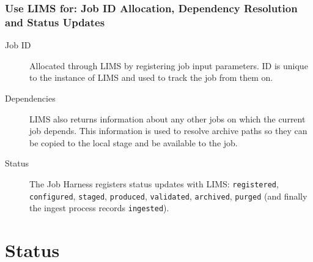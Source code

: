 \documentclass[xcolor=dvipsnames]{beamer}
\newcommand{\code}[1]{\texttt{#1}}
\begin{document}
\begin{frame}
  \frametitle{Use LIMS for: Job ID Allocation, Dependency Resolution and Status Updates}

  \begin{description}
  \item[Job ID] Allocated through LIMS by registering job input
    parameters.  ID is unique to the instance of LIMS and used to
    track the job from them on.
  \item[Dependencies] LIMS also returns information about any other
    jobs on which the current job depends.  This information is used
    to resolve archive paths so they can be copied to the local stage
    and be available to the job.
  \item[Status] The Job Harness registers status updates with LIMS:
    \code{registered}, \code{configured}, \code{staged},
    \code{produced}, \code{validated}, \code{archived}, \code{purged}
    (and finally the ingest process records \code{ingested}).
  \end{description}

\end{frame}

\section{Status}

\begin{frame}
\end{frame}
\end{document}
